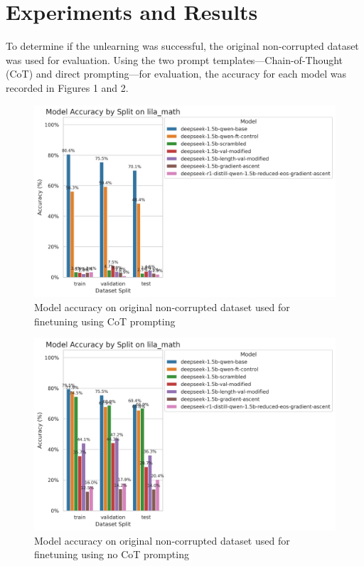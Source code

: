 \documentclass[10pt]{article}
\begin{document}
\section{Experiments and Results}
To determine if the unlearning was successful, the original non-corrupted dataset was used for evaluation. Using the two prompt templates—Chain-of-Thought (CoT) and direct prompting—for evaluation, the accuracy for each model was recorded in Figures 1 and 2. 
\\
\begin{figure}[h]
    \centering
    \includegraphics[width=1\linewidth]{main_prompt_lila_math_accuracy_by_split_20250504_230401.png}
    \caption{Model accuracy on original non-corrupted dataset used for finetuning using CoT prompting}
    \label{fig:enter-label-cot}
\end{figure}
\begin{figure}[h]
    \centering
    \includegraphics[width=1\linewidth]{new_prompt_lila_math_accuracy_by_split_20250505_192457.png}
    \caption{Model accuracy on original non-corrupted dataset used for finetuning using no CoT prompting}
    \label{fig:enter-label-no-cot}
\end{figure}
\end{document}
